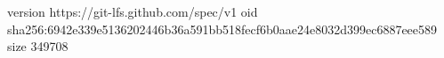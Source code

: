 version https://git-lfs.github.com/spec/v1
oid sha256:6942e339e5136202446b36a591bb518fecf6b0aae24e8032d399ec6887eee589
size 349708
